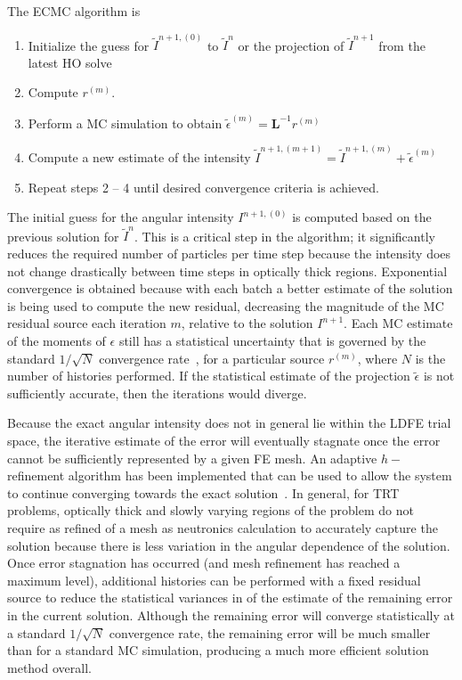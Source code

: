 \documentclass[11pt]{article}
\newcommand{\B}[1]{\ensuremath{\mathbf{#1}}}
\begin{document}
The ECMC algorithm is
\begin{enumerate}
    \item Initialize the guess for $\tilde{I}^{n+1,(0)}$ to $\tilde{I}^{n}$ or the
        projection of $\tilde{I}^{n+1}$ from the latest HO solve
\item Compute $r^{(m)}$.
\item Perform a MC simulation to obtain $\tilde{\epsilon}^{(m)} = \B L^{-1} r^{(m)}$
\item Compute a new estimate of the intensity $\tilde I^{n+1,(m+1)} = \tilde I^{n+1,(m)}
+ \tilde\epsilon^{(m)}$
\item Repeat steps 2 -- 4 until desired convergence criteria is achieved. 
\end{enumerate}
The initial guess for the angular intensity $I^{n+1,(0)}$ is computed based on the previous solution
for $\tilde{I}^{n}$. This is a critical step in the algorithm; it significantly reduces the required number of
particles per time step because the intensity does not change drastically between time steps in
optically thick regions.  
Exponential convergence is obtained because with each batch a
better estimate of the solution is being used to compute the new residual, decreasing
the magnitude of the MC residual source each iteration $m$, relative to the solution
$I^{n+1}$.  Each MC
estimate of the moments of $\epsilon$ still has a statistical uncertainty that is
governed by the standard $1/\sqrt{N}$ convergence rate~\cite{shultis_mc}, for a
particular source $r^{(m)}$, where $N$ is the number of histories performed.  If the statistical estimate of the projection $\tilde\epsilon$ is not sufficiently
accurate, then the iterations would diverge.  

Because the exact angular intensity does not in general lie within the LDFE trial space, the
iterative estimate of the error will eventually stagnate once the error cannot be sufficiently
represented by a given FE mesh.  An adaptive $h-$refinement algorithm has been
implemented that can be used to allow the system to continue converging towards the
exact solution~\cite{jake,ans_2014}. In general, for TRT problems, optically thick and slowly varying
regions of the problem do not require as refined of a mesh as neutronics calculation to accurately capture the
solution because there is less variation in the angular dependence of the solution.
Once error stagnation has occurred (and mesh refinement has reached a maximum level),
additional histories can be performed with a
fixed residual source to reduce the statistical variances in of the estimate of the
remaining error in the current solution.  Although the remaining error will
converge statistically at a standard $1/\sqrt{N}$ convergence rate, the remaining
error will be much smaller than for a standard MC simulation, producing a much more
efficient solution method overall.
\end{document}
